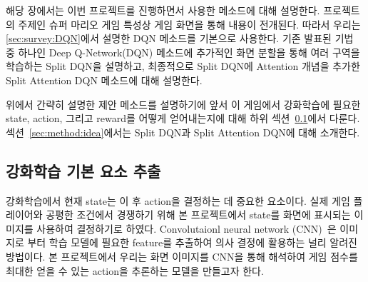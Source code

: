 해당 장에서는 이번 프로젝트를 진행하면서 사용한 메소드에 대해 설명한다.
프로젝트의 주제인 슈퍼 마리오 게임 특성상 게임 화면을 통해 내용이 전개된다. 
따라서 우리는 \ref{sec:survey:DQN}에서 설명한 DQN 메소드를 기본으로 사용한다.
기존 발표된 기법 중 하나인 Deep Q-Network(DQN) 메소드에 추가적인 화면 분할을 통해 여러 구역을 학습하는 Split DQN을 설명하고, 최종적으로 Split DQN에 Attention 개념을 추가한 Split Attention DQN 메소드에 대해 설명한다.

위에서 간략히 설명한 제안 메소드를 설명하기에 앞서 이 게임에서 강화학습에 필요한 state, action, 그리고 reward를 어떻게 얻어내는지에 대해 하위 섹션~\ref{sec:method:basis}에서 다룬다.
섹션~\ref{sec:method:idea}에서는 Split DQN과 Split Attention DQN에 대해 소개한다.

\subsection{강화학습 기본 요소 추출}
\label{sec:method:basis}
강화학습에서 현재 state는 이 후 action을 결정하는 데 중요한 요소이다.
실제 게임 플레이어와 공평한 조건에서 경쟁하기 위해 본 프로젝트에서 state를 화면에 표시되는 이미지를 사용하여 결정하기로 하였다.
Convolutaionl neural network (CNN)~\cite{CNN}은 이미지로 부터 학습 모델에 필요한 feature를 추출하여 의사 결정에 활용하는 널리 알려진 방법이다.
본 프로젝트에서 우리는 화면 이미지를 CNN을 통해 해석하여 게임 점수를 최대한 얻을 수 있는 action을 추론하는 모델을 만들고자 한다.

